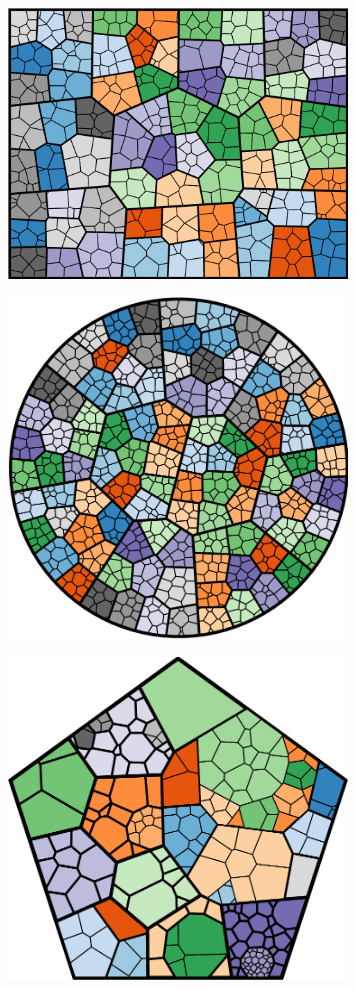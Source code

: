 \documentclass{acm_proc_article-sp}
\begin{document}
\begin{figure}
\centering
\includegraphics[width=90mm]{source images/random-10-3-025-rect.png}
\caption{}
\end{figure}
\begin{figure}
\centering
\includegraphics[width=90mm]{source images/random-10-3-000-circle.png}
\caption{}
\end{figure}
\begin{figure}
\centering
\includegraphics[width=90mm]{source images/flare-color-pentagon-100.png}
\caption{}
\end{figure}
\end{document}
